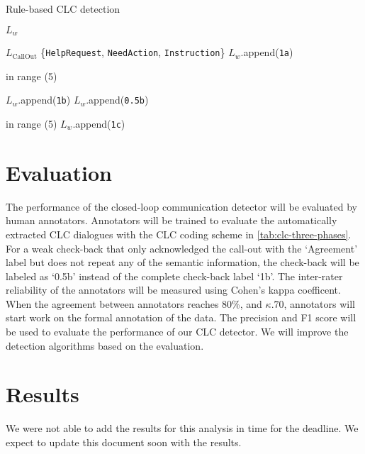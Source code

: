 \begin{algorithm}
    \caption{Rule-based CLC detection}\label{alg:CLC}
    \begin{algorithmic}[1]
        \State $L_w$ \gets []

        \State $L_\text{CallOut}$ \gets \{\texttt{HelpRequest}, \texttt{NeedAction}, \texttt{Instruction}\}
          
                \State $L_w$.append(\texttt{1a})
            \EndIf
        \EndFunction

         in range (5)

                \State $L_w$.append(\texttt{1b})
                \EndIf
            \Else
                \State $L_w$.append(\texttt{0.5b})
            \EndIf
        \EndFunction

         in range (5)
                \State $L_w$.append(\texttt{1c})
            \EndIf
        \EndFunction
    \end{algorithmic}
\end{algorithm}

\section{Evaluation}

The performance of the closed-loop communication detector will be evaluated by
human annotators. Annotators will be trained to evaluate the automatically
extracted CLC dialogues with the CLC coding scheme in
\autoref{tab:clc-three-phases}. For a weak check-back that only acknowledged
the call-out with the ‘Agreement’ label but does not repeat any of the semantic
information, the check-back will be labeled as ‘0.5b’ instead of the complete
check-back label `1b'.  The inter-rater reliability of the annotators will be
measured using Cohen’s kappa coefficent. When the agreement between annotators
reaches 80\%, and $\kappa.70$, annotators will start work on the formal
annotation of the data. The precision and F1 score will be used to evaluate the
performance of our CLC detector. We will improve the detection algorithms based
on the evaluation.

\section{Results}

We were not able to add the results for this analysis in time for the deadline.
We expect to update this document soon with the results.
